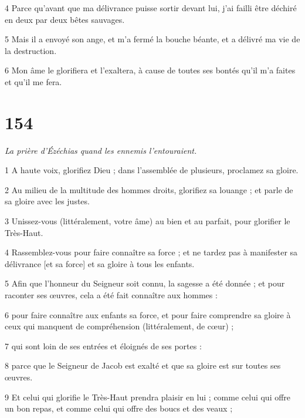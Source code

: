 \par 4 Parce qu'avant que ma délivrance puisse sortir devant lui, j'ai failli être déchiré en deux par deux bêtes sauvages.

\par 5 Mais il a envoyé son ange, et m'a fermé la bouche béante, et a délivré ma vie de la destruction.

\par 6 Mon âme le glorifiera et l'exaltera, à cause de toutes ses bontés qu'il m'a faites et qu'il me fera.

\chapter{154}

\par \textit{La prière d'Ézéchias quand les ennemis l'entouraient.}

\par 1 A haute voix, glorifiez Dieu ; dans l’assemblée de plusieurs, proclamez sa gloire.

\par 2 Au milieu de la multitude des hommes droits, glorifiez sa louange ; et parle de sa gloire avec les justes.

\par 3 Unissez-vous (littéralement, votre âme) au bien et au parfait, pour glorifier le Très-Haut.

\par 4 Rassemblez-vous pour faire connaître sa force ; et ne tardez pas à manifester sa délivrance [et sa force] et sa gloire à tous les enfants.

\par 5 Afin que l'honneur du Seigneur soit connu, la sagesse a été donnée ; et pour raconter ses œuvres, cela a été fait connaître aux hommes :

\par 6 pour faire connaître aux enfants sa force, et pour faire comprendre sa gloire à ceux qui manquent de compréhension (littéralement, de cœur) ;

\par 7 qui sont loin de ses entrées et éloignés de ses portes :

\par 8 parce que le Seigneur de Jacob est exalté et que sa gloire est sur toutes ses œuvres.

\par 9 Et celui qui glorifie le Très-Haut prendra plaisir en lui ; comme celui qui offre un bon repas, et comme celui qui offre des boucs et des veaux ;

